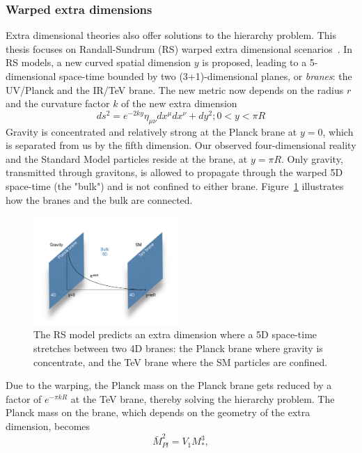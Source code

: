 \subsubsection{Warped extra dimensions}
\label{sec:theory:wed}
Extra dimensional theories also offer solutions to the hierarchy problem. This thesis focuses on Randall-Sundrum (RS) warped extra dimensional scenarios~\cite{PhysRevLett.83.3370}. In RS models, a new curved spatial dimension $y$ is proposed, leading to a 5-dimensional space-time bounded by two (3+1)-dimensional planes, or \emph{branes}: the UV/Planck and the IR/TeV brane. The new metric now depends on the radius $r$ and the curvature factor $k$ of the new extra dimension
\begin{equation}
  ds^2=e^{-2ky}\eta_{\mu\nu}dx^{\mu}dx^{\nu}+dy^2; 0 < y < \pi R
\end{equation}
Gravity is concentrated and relatively strong at the Planck brane at $y=0$, which is separated from us by the fifth dimension. Our observed four-dimensional reality and the Standard Model particles reside at the \TeV brane, at $y=\pi R$. Only gravity, transmitted through gravitons, is allowed to propagate through the warped 5D space-time (the "bulk") and is not confined to either brane. Figure~\ref{fig:theory:rs1} illustrates how the branes and the bulk are connected.
\begin{figure}[h!]
\centering
\includegraphics[width=0.49\textwidth]{figures/theory/rs1.pdf}
\caption{The RS model predicts an extra dimension where a 5D space-time stretches between two 4D branes: the Planck brane where gravity is concentrate, and the TeV brane where the SM particles are confined.}
\label{fig:theory:rs1}
\end{figure}
 Due to the warping, the Planck mass on the Planck brane gets reduced by a factor of $e^{-\pi kR}$ at the TeV brane, thereby solving the hierarchy problem. The Planck mass on the \TeV brane, which depends on the geometry of the extra dimension, becomes
\begin{equation}
  \bar{M}_{Pl}^2=V_1M_*^3,
  \end{equation} 
